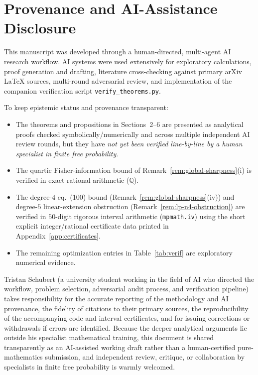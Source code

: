 \documentclass[11pt,a4paper]{article}
\theoremstyle{definition}
\begin{document}
\clearpage
\section*{Provenance and AI-Assistance Disclosure}

This manuscript was developed through a human-directed, multi-agent AI research workflow. AI systems were used extensively for exploratory calculations, proof generation and drafting, literature cross-checking against primary arXiv LaTeX sources, multi-round adversarial review, and implementation of the companion verification script \texttt{verify\_theorems.py}.

To keep epistemic status and provenance transparent:
\begin{itemize}
\item The theorems and propositions in Sections~2--6 are presented as analytical proofs checked symbolically/numerically and across multiple independent AI review rounds, but they have \emph{not yet been verified line-by-line by a human specialist in finite free probability}.
\item The quartic Fisher-information bound of Remark~\ref{rem:global-sharpness}(i) is verified in exact rational arithmetic ($\mathbb{Q}$).
\item The degree-$4$ eq.~(100) bound (Remark~\ref{rem:global-sharpness}(iv)) and degree-$5$ linear-extension obstruction (Remark~\ref{rem:lp-n4-obstruction}) are verified in $50$-digit rigorous interval arithmetic (\texttt{mpmath.iv}) using the short explicit integer/rational certificate data printed in Appendix~\ref{app:certificates}.
\item The remaining optimization entries in Table~\ref{tab:verif} are exploratory numerical evidence.
\end{itemize}

Tristan Schubert (a university student working in the field of AI who directed the workflow, problem selection, adversarial audit process, and verification pipeline) takes responsibility for the accurate reporting of the methodology and AI provenance, the fidelity of citations to their primary sources, the reproducibility of the accompanying code and interval certificates, and for issuing corrections or withdrawals if errors are identified. Because the deeper analytical arguments lie outside his specialist mathematical training, this document is shared transparently as an AI-assisted working draft rather than a human-certified pure-mathematics submission, and independent review, critique, or collaboration by specialists in finite free probability is warmly welcomed.
\end{document}
